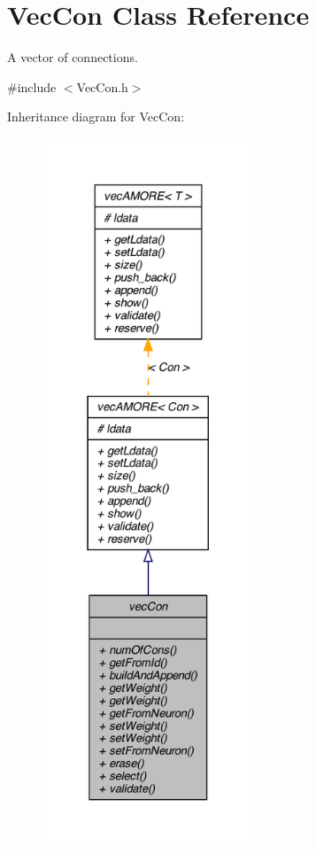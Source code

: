 \hypertarget{classvec_con}{
\section{VecCon Class Reference}
\label{classvec_con}
}


A vector of connections.  




{\ttfamily \#include $<$VecCon.h$>$}



Inheritance diagram for VecCon:
\nopagebreak
\begin{figure}[H]
\begin{center}
\leavevmode
\includegraphics[height=600pt]{classvec_con__inherit__graph}
\end{center}
\end{figure}


